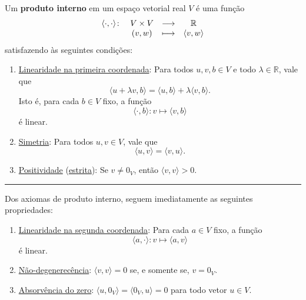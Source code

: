 \begin{definition}
	Um \textbf{produto interno} em um espaço vetorial real $V$ é uma função
	\[\begin{array}{r c c c}
		\langle\cdot,\cdot\rangle\colon
			&V\times V
				&\longrightarrow
					&\mathbb{R}\\
			&(v,w)
				&\longmapsto
					&\langle v,w\rangle
		\end{array}\]
	satisfazendo às seguintes condições:
	\begin{enumerate}
		\item \uline{Linearidade na primeira coordenada}: Para todos $u,v,b\in V$ e todo $\lambda\in\mathbb{R}$, vale que
			\[\langle u+\lambda v,b\rangle=\langle u,b\rangle+\lambda\langle v,b\rangle.\]
			Isto é, para cada $b\in V$ fixo, a função
			\[\langle\cdot,b\rangle\colon v\mapsto\langle v,b\rangle\]
			é linear.
			
		\item \uline{Simetria}: Para todos $u,v\in V$, vale que
			\[\langle u,v\rangle=\langle v,u\rangle.\]
		\item \uline{Positividade} (\uline{estrita}): Se $v\neq 0_V$, então $\langle v,v\rangle>0$.
	\end{enumerate}
	
	\hrule
	

	Dos axiomas de produto interno, seguem imediatamente as seguintes propriedades:
	\begin{enumerate}
		\item \uline{Linearidade na segunda coordenada}: Para cada $a\in V$ fixo, a função
			\[\langle a,\cdot\rangle\colon v\mapsto\langle a,v\rangle\]
			é linear.
		\item \uline{Não-degenerecência}: $\langle v,v\rangle=0$ se, e somente se, $v=0_V$.
		\item \uline{Absorvência do zero}: $\langle u,0_V\rangle=\langle 0_V,u\rangle=0$ para todo vetor $u\in V$.
	\end{enumerate}
\end{definition}